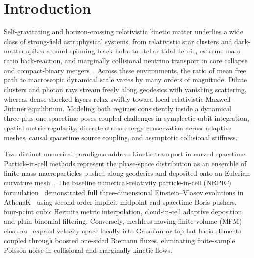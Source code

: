 \section{Introduction}\label{sec:intro}

Self-gravitating and horizon-crossing relativistic kinetic matter underlies a wide class of strong-field astrophysical systems, from relativistic star clusters and dark-matter spikes around spinning black holes to stellar tidal debris, extreme-mass-ratio back-reaction, and marginally collisional neutrino transport in core collapse and compact-binary mergers~\cite{1985ApJ...298...34S,1985ApJ...298...58S,Shapiro:1991zza,Andreasson:2011ng,Acuna-Cardenas:2021nkj}. Across these environments, the ratio of mean free path to macroscopic dynamical scale varies by many orders of magnitude. Dilute clusters and photon rays stream freely along geodesics with vanishing scattering, whereas dense shocked layers relax swiftly toward local relativistic Maxwell--J\"uttner equilibrium. Modeling both regimes consistently inside a dynamical three-plus-one spacetime poses coupled challenges in symplectic orbit integration, spatial metric regularity, discrete stress-energy conservation across adaptive meshes, causal spacetime source coupling, and asymptotic collisional stiffness.

Two distinct numerical paradigms address kinetic transport in curved spacetime. Particle-in-cell methods represent the phase-space distribution as an ensemble of finite-mass macroparticles pushed along geodesics and deposited onto an Eulerian curvature mesh~\cite{Shibata:1999va,Shibata:1999wi,East:2019bwu,Galishnikova:2025pfi,Wu:2026nrpic}. The baseline numerical-relativity particle-in-cell (NRPIC) formulation~\cite{Wu:2026nrpic} demonstrated full three-dimensional Einstein--Vlasov evolutions in AthenaK~\cite{2026ApJS..283...27S,Zhu:2024utz} using second-order implicit midpoint and spacetime Boris pushers, four-point cubic Hermite metric interpolation, cloud-in-cell adaptive deposition, and plain binomial filtering. Conversely, meshless moving-finite-volume (MFM) closures~\cite{Hopkins:2015mfc,Hopkins:2026lbv} expand velocity space locally into Gaussian or top-hat basis elements coupled through boosted one-sided Riemann fluxes, eliminating finite-sample Poisson noise in collisional and marginally kinetic flows.

